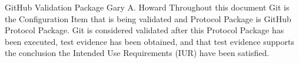 \documentclass[10pt]{tlc-article}
\begin{document}
  \global\def\configurationitem{Git}

  \tlcTitlePageAndTableOfContents
    {GitHub Validation Package}
    {Gary A. Howard}
    {Throughout this document Git is the Configuration Item that is being
     validated and Protocol Package is GitHub Protocol Package.  Git is
     considered validated after this Protocol Package has been executed, test
     evidence has been obtained, and that test evidence supports the conclusion
     the Intended Use Requirements (IUR) have been satisfied.}

  
\end{document}
